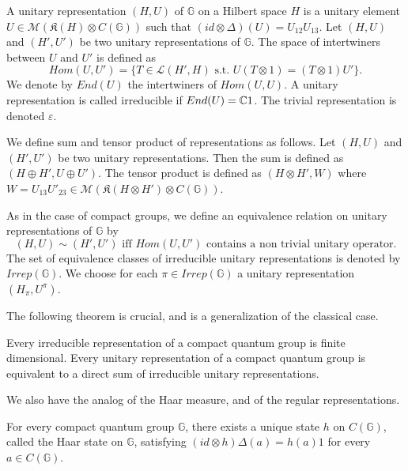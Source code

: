 \begin{definition} A unitary representation $(H,U)$ of $\mathbb G$ on a Hilbert space $H$ is a unitary element $U \in \mathcal M(\mathfrak K(H)\otimes C(\mathbb G))$ such that $(id\otimes\Delta)(U) = U_{12}U_{13}$. Let $(H,U)$ and $(H',U')$ be two unitary representations of $\mathbb G$. The space of intertwiners between $U$ and $U'$ is defined as 
\[Hom(U,U') = \{T\in \mathcal L(H',H) \text{ s.t. }U(T\otimes 1) = (T\otimes 1) U' \}.\]
We denote by $End(U)$ the intertwiners of $Hom(U,U)$. A unitary representation is called irreducible if $End(U) = \mathbb C 1$. The trivial representation is denoted $\varepsilon$.
\end{definition}

We define sum and tensor product of representations as follows. Let $(H,U)$ and $(H',U')$ be two unitary representations. Then the sum is defined as $(H\oplus H', U\oplus U')$. The tensor product is defined as $(H\otimes H',W)$ where $W = U_{13} U'_{23}\in \mathcal M(\mathfrak K(H\otimes H')\otimes C(\mathbb G))$. 

\begin{definition}
As in the case of compact groups, we define an equivalence relation on unitary representations of $\mathbb G$ by 
\[(H,U)\sim (H',U') \text{ iff } Hom(U,U') \text{ contains a non trivial unitary operator}.\]
The set of equivalence classes of irreducible unitary representations is denoted by $Irrep(\mathbb G)$. We choose for each $\pi\in Irrep (\mathbb G)$ a unitary representation $(H_\pi, U^{\pi})$. 
\end{definition}

The following theorem is crucial, and is a generalization of the classical case. 

\begin{thm} Every irreducible representation of a compact quantum group is finite dimensional. Every unitary representation of a compact quantum group is equivalent to a direct sum of irreducible unitary representations. 
\end{thm}
 
We also have the analog of the Haar measure, and of the regular representations.

\begin{prop}
For every compact quantum group $\mathbb G$, there exists a unique state $h$ on $C(\mathbb G)$, called the Haar state on $\mathbb G$, satisfying $(id\otimes h)\Delta(a) = h(a)1$ for every $a\in C(\mathbb G)$. 
\end{prop}

